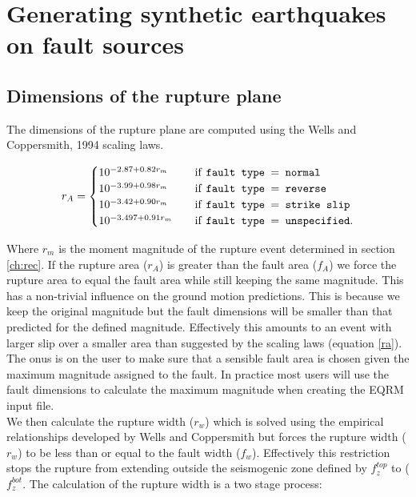 \section{Generating synthetic earthquakes on fault sources}
\label{sec:fault_gen}

\subsection{Dimensions of the rupture plane}
\label{sec:rup_dimn}

The dimensions of the rupture plane are computed using the Wells and Coppersmith, 1994 scaling laws. 

\begin{equation} \label{ra}
r_A = 
\begin{cases}
10^{-2.87 + 0.82r_m}	& \quad \mbox{if \texttt{fault type $=$  normal}} \\
10^{-3.99 + 0.98r_m}	& \quad \mbox{if \texttt{fault type $=$  reverse}} \\
10^{-3.42 + 0.90r_m}	& \quad \mbox{if \texttt{fault type $=$  strike slip}} \\
10^{-3.497 + 0.91r_m}	& \quad \mbox{if \texttt{fault type $=$  unspecified}} . \\
\end{cases}
\end{equation}

Where $r_m$ is the moment magnitude of the rupture event determined in section \ref{ch:rec}. If the rupture area ($r_A$) is greater than the fault area ($f_A$) 
we force the rupture area to equal the fault area while still keeping the same magnitude. This has a non-trivial influence on the ground motion predictions.  
This is because we keep the original magnitude but the fault dimensions will be smaller than that predicted for the defined magnitude. Effectively this 
amounts to an event with larger slip over a smaller area
than suggested by the scaling laws (equation \ref{ra}). The onus is on the user to make sure that a sensible fault area is chosen given 
the maximum magnitude assigned to the fault. In practice most users will use the fault dimensions to calculate the maximum magnitude
when creating the EQRM input file. \\

We then calculate the rupture width ($r_w$) which is solved using the empirical relationships developed by Wells and Coppersmith \cite{wells1994}  
but forces the rupture width ($r_w$) to be less than or equal to the fault width ($f_w$). Effectively this restriction stops the rupture from extending 
outside the seismogenic zone defined by $f_z^{top}$ to ($f_z^{bot}$. The calculation of the rupture width is a two stage process:



